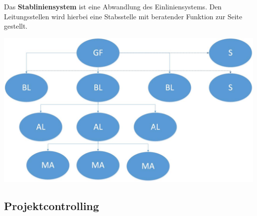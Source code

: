 Das \textbf{Stabliniensystem} ist eine Abwandlung des Einliniensystems. Den Leitungsstellen wird hierbei eine Stabsstelle mit beratender Funktion zur Seite gestellt.

\includegraphics[scale=0.3]{1jahr_pictures/lf02-pic/lf02-stabliniensystem.jpg}


\subsection{Projektcontrolling}

